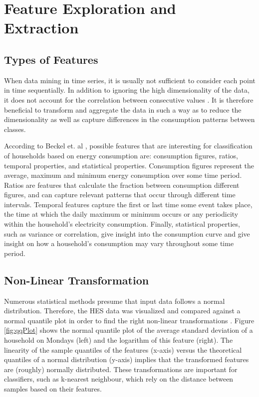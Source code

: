 \chapter{Feature Exploration and Extraction}
\label{ch:Features}

\section{Types of Features}
When data mining in time series, it is usually not sufficient to consider each point in time sequentially. In addition to ignoring the high dimensionality of the data,  it does not account for the correlation between consecutive values \cite{Moerchen}. It is therefore beneficial to transform and aggregate the data in such a way as to reduce the dimensionality as well as capture differences in the consumption patterns between classes. 

According to Beckel et. al \cite{Beckel_2}, possible features that are interesting for classification of households based on energy consumption are: consumption figures, ratios, temporal properties, and statistical properties. Consumption figures represent the average, maximum and minimum energy consumption over some time period. Ratios are features that calculate the fraction between consumption different figures, and can capture relevant patterns that occur through different time intervals. Temporal features capture the first or last time some event takes place, the time at which the daily maximum or minimum occurs or any periodicity within the household's electricity consumption. Finally, statistical properties, such as variance or correlation, give insight into the consumption curve and give insight on how a household's consumption may vary throughout some time period.

\section{Non-Linear Transformation}
Numerous statistical methods presume that input data follows a normal distribution. Therefore, the HES data was visualized and compared against a normal quantile plot in order to find the right non-linear transformations \cite{Osborne} \cite{Wang}. Figure \ref{fig:qqPlot} shows the normal quantile plot of the average standard deviation of a household on Mondays (left) and the logarithm of this feature (right). The linearity of the sample quantiles of the features (x-axis) versus the theoretical quantiles of a normal distribution (y-axis) implies that the transformed features are (roughly) normally distributed. These transformations are important for classifiers, such as k-nearest neighbour, which rely on the distance between samples based on their features.

